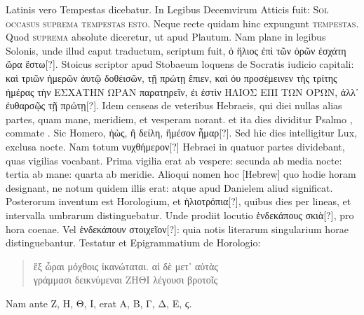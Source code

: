 Latinis
vero Tempestas dicebatur.
In Legibus Decemvirum Atticis fuit:
\textsc{Sol occasus suprema tempestas esto}.
Neque recte
quidam hinc expungunt \textsc{tempestas}.
Quod \textsc{suprema} absolute
diceretur, ut apud Plautum.
Nam plane in legibus Solonis, unde illud
caput traductum, scriptum fuit,
 \textgreek{ὁ ἥλιος ἐπὶ τῶν ὀρῶν ἐσχάτη ὥρα ἔστω[?]}.
Stoicus
scriptor apud Stobaeum loquens de Socratis iudicio capitali: 
\textgreek{καὶ
τριῶν ἡμερῶν ἀυτῷ δοθέισῶν, τῇ πρώτῃ ἔπιεν,
 καὶ ὀυ προσέμεινεν τὴς τρίτης ἡμέρας τὴν
ΕΣΧΑΤΗΝ ΩΡΑΝ παρατηρεῖν, ἐι ἐστὶν ΗΛΙΟΣ ΕΠΙ ΤΩΝ
ΟΡΩΝ, ἀλλ᾽ ἐυθαρσῷς τῇ πρώτῃ[?]}.
Idem censeas de veteribus Hebraeis,
qui diei nullas alias partes, quam mane, meridiem, et vesperam norant.
et ita dies dividitur Psalmo , commate .
%
Sic Homero,
\textgreek{ἠὼς, ἢ δείλη, ἢμέσον ἦμαρ[?]}.
Sed hic dies intelligitur Lux, exclusa nocte.
Nam totum \textgreek{νυχθήμερον[?]} Hebraei in quatuor partes
 dividebant, quas vigilias
vocabant.
Prima vigilia erat ab vespere: secunda ab media nocte:
tertia ab mane: quarta ab meridie.
Alioqui nomen hoc \texthebrew{[Hebrew]} quo hodie
horam designant, ne notum quidem illis erat: atque apud Danielem
aliud significat.
Posterorum inventum est Horologium, et \textgreek{ἡλιοτρόπια[?]},
quibus dies per lineas, et intervalla umbrarum distinguebatur.
Unde prodiit locutio \textgreek{ἑνδεκάπους σκιὰ[?]}, pro hora coenae.
Vel \textgreek{ἑνδεκάπουν στοιχεῖον[?]}:
quia notis literarum singularium horae distinguebantur.
Testatur et Epigrammatium de Horologio:
\begin{verse}
\textgreek{ἓξ ὧραι μόχθοις ἱκανώταται. αἱ δὲ μετ᾽ αὐτὰς}\\
\textgreek{γράμμασι δεικνύμεναι ΖΗΘΙ λέγουσι βροτοῖς}
\end{verse}
%
\begin{table}[p]
  
\end{table}
%
Nam ante
\textgreek{Ζ, Η, Θ, Ι,} erat \textgreek{Α, Β, Γ, Δ, Ε, ϛ.}
